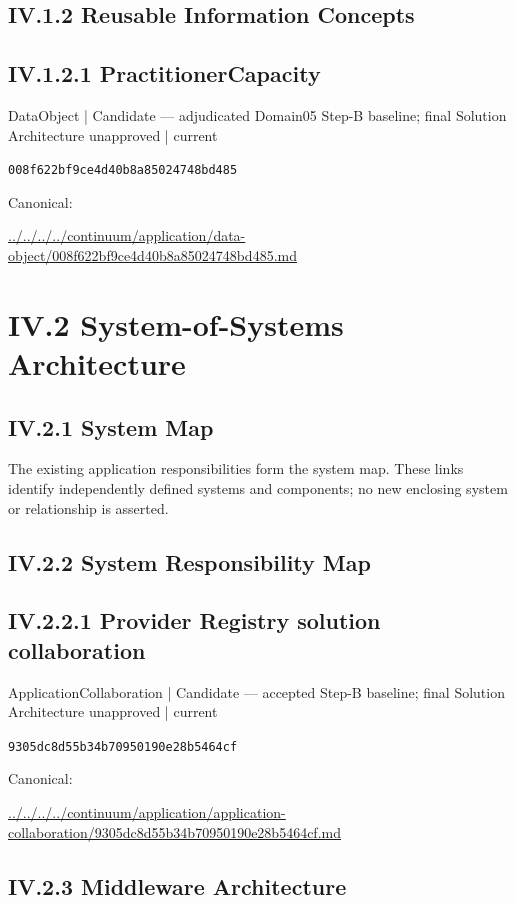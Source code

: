 \documentclass[10pt,a4paper]{article}
\begin{document}
\subsection*{IV.1.2 Reusable Information Concepts}
\subsection*{IV.1.2.1 PractitionerCapacity}
{\small DataObject | Candidate — adjudicated Domain05 Step-B baseline; final Solution Architecture unapproved | current}\par
\texttt{008f622bf9ce4d40b8a85024748bd485}\par
Canonical: \par
{\footnotesize\url{../../../../continuum/application/data-object/008f622bf9ce4d40b8a85024748bd485.md}}\par
\section*{IV.2 System-of-Systems Architecture}
\subsection*{IV.2.1 System Map}
The existing application responsibilities form the system map. These links identify independently defined systems and components; no new enclosing system or relationship is asserted.\par
\subsection*{IV.2.2 System Responsibility Map}
\subsection*{IV.2.2.1 Provider Registry solution collaboration}
{\small ApplicationCollaboration | Candidate — accepted Step-B baseline; final Solution Architecture unapproved | current}\par
\texttt{9305dc8d55b34b70950190e28b5464cf}\par
Canonical: \par
{\footnotesize\url{../../../../continuum/application/application-collaboration/9305dc8d55b34b70950190e28b5464cf.md}}\par
\subsection*{IV.2.3 Middleware Architecture}
\end{document}
